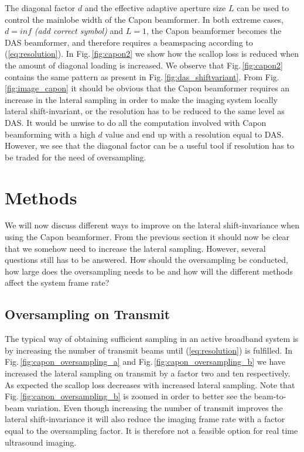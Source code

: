 \documentclass[journal]{IEEEtran}
\newcommand{\img}{img/}
\newcommand\comment[1]{\textit{{\color{red}(#1)}}}
\begin{document}
The diagonal factor $d$ and the effective adaptive aperture size $L$ can be used to control the mainlobe width of the Capon beamformer. In both extreme cases, $d=inf$ \comment{add correct symbol} and $L=1$, the Capon beamformer becomes the DAS beamformer, and therefore requires a beamspacing according to (\ref{eq:resolution}). In Fig.\,\ref{fig:capon2} we show how the scallop loss is reduced when the amount of diagonal loading is increased. We observe that Fig.\,\ref{fig:capon2} contains the same pattern as present in Fig.\,\ref{fig:das_shiftvariant}. From Fig.\,\ref{fig:image_capon} it should be obvious that the Capon beamformer requires an increase in the lateral sampling in order to make the imaging system locally lateral shift-invariant, or the resolution has to be reduced to the same level as DAS. It would be unwise to do all the computation involved with Capon beamforming with a high $d$ value and end up with a resolution equal to DAS. However, we see that the diagonal factor can be a useful tool if resolution has to be traded for the need of oversampling.
  

\begin{figure*}[!t]
\centerline{
\subfloat[]{
\texttt{[image: \\img capon\_L=32\_K=1\_d=001\_2.eps]}\label{fig:capon1}
}
\subfloat[]{
\texttt{[image: \\img capon\_L=32\_K=1\_d=1\_2.eps]}\label{fig:capon2}
}
}
\caption{...}
\label{fig:image_capon}
\end{figure*}

\section{Methods}
We will now discuss different ways to improve on the lateral shift-invariance when using the Capon beamformer. From the previous section it should now be clear that we somehow need to increase the lateral sampling. However, several questions still has to be answered. How should the oversampling be conducted, how large does the oversampling needs to be and how will the different methods affect the system frame rate? 

\subsection{Oversampling on Transmit}
The typical way of obtaining sufficient sampling in an active broadband system is by increasing the number of transmit beams until (\ref{eq:resolution}) is fulfilled. In Fig.\,\ref{fig:capon_oversampling_a} and Fig.\,\ref{fig:capon_oversampling_b} we have increased the lateral sampling on transmit by a factor two and ten respectively. As expected the scallop loss decreases with increased lateral sampling. Note that Fig.\,\ref{fig:capon_oversampling_b} is zoomed in order to better see the beam-to-beam variation. Even though increasing the number of transmit improves the lateral shift-invariance it will also reduce the imaging frame rate with a factor equal to the oversampling factor. It is therefore not a feasible option for real time ultrasound imaging.
\end{document}
